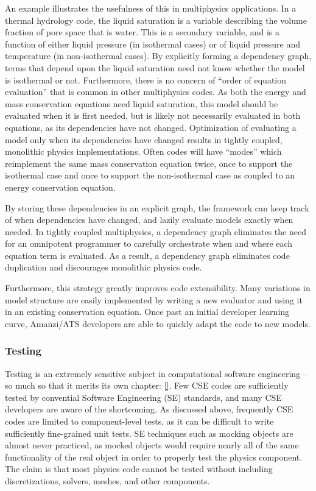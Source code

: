 An example illustrates the usefulness of this in multiphysics applications.
In a thermal hydrology code, the liquid saturation is a variable describing the volume fraction of pore space that is water.
This is a secondary variable, and is a function of either liquid pressure (in isothermal cases) or of liquid pressure and temperature (in non-isothermal cases).
By explicitly forming a dependency graph, terms that depend upon the liquid saturation need not know whether the model is isothermal or not.
Furthermore, there is no concern of ``order of equation evaluation'' that is common in other multiphysics codes.
As both the energy and mass conservation equations need liquid saturation, this model should be evaluated when it is first needed, but is likely not necessarily evaluated in both equations, as its dependencies have not changed.
Optimization of evaluating a model only when its dependencies have changed results in tightly coupled, monolithic physics implementations.
Often codes will have ``modes'' which reimplement the same mass conservation equation twice, once to support the isothermal case and once to support the non-isothermal case as coupled to an energy conservation equation.

By storing these dependencies in an explicit graph, the framework can keep track of when dependencies have changed, and lazily evaluate models exactly when needed.
In tightly coupled multiphysics, a dependency graph eliminates the need for an omnipotent programmer to carefully orchestrate when and where each equation term is evaluated.
As a result, a dependency graph eliminates code duplication and discourages monolithic physics code.

Furthermore, this strategy greatly improves code extensibility.
Many variations in model structure are easily implemented by writing a new evaluator and using it in an existing conservation equation.
Once past an initial developer learning curve, Amanzi/ATS developers are able to quickly adapt the code to new models.

\subsubsection{Testing}
\label{sec:amanzi:testing}
%
Testing is an extremely sensitive subject in computational software engineering -- so much so that it merits its own chapter: \ref{}.
Few CSE codes are sufficiently tested by convential Software Engineering (SE) standards, and many CSE developers are aware of the shortcoming.
As discussed above, frequently CSE codes are limited to component-level tests, as it can be difficult to write sufficiently fine-grained unit tests.
SE techniques such as mocking objects are almost never practiced, as mocked objects would require nearly all of the same functionality of the real object in order to properly test the physics component.
The claim is that most physics code cannot be tested without including discretizations, solvers, meshes, and other components.

